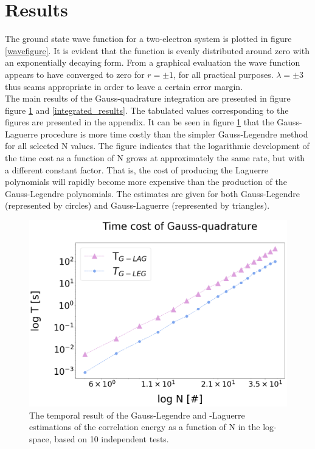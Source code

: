 \documentclass[%
reprint,nofootinbib,
amsmath,amssymb,
aps,
]{revtex4-1}
\begin{document}
\section{Results}  \noindent
The ground state wave function for a two-electron system is plotted in figure \ref{wavefigure}. It is evident that the function is evenly distributed around zero with an exponentially decaying form. From a graphical evaluation the wave function appears to have converged to zero for $r = \pm 1$, for all practical purposes. $\lambda = \pm 3$ thus seams appropriate in order to leave a certain error margin. \\ \indent 
The main results of the Gauss-quadrature integration are presented in figure figure \ref{integrated_time_l} and \ref{integrated_results}. The tabulated values corresponding to the figures are presented in the appendix. It can be seen in figure \ref{integrated_time_l} that the Gauss-Laguerre procedure is more time costly than the simpler Gauss-Legendre method for all selected N values. The figure indicates that the logarithmic development of the time cost as a function of N grows at approximately the same rate, but with a different constant factor. That is, the cost of producing the Laguerre polynomials will rapidly become more expensive than the production of the Gauss-Legendre polynomials. The estimates are given for both Gauss-Legendre (represented by circles) and  Gauss-Laguerre (represented by triangles).
\begin{figure}[!hb]
	\includegraphics[width=\columnwidth]{Gauss_time.png}
	\caption{\label{integrated_time_l} The temporal result of the Gauss-Legendre and -Laguerre estimations of the correlation energy as a function of N in the log-space, based on 10 independent tests.}
\end{figure} 
\end{document}
